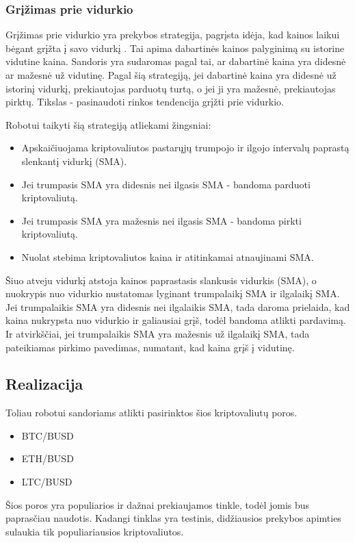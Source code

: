 \documentclass{VUMIFInfKursinis}
\begin{document}
\subsubsection{Grįžimas prie vidurkio}

Grįžimas prie vidurkio yra prekybos strategija, pagrįsta idėja, kad kainos laikui bėgant grįžta į savo vidurkį \cite{voltaprofitable}. 
Tai apima dabartinės kainos palyginimą su istorine vidutine kaina. Sandoris yra sudaromas pagal tai, ar dabartinė kaina yra didesnė ar mažesnė už vidutinę.
Pagal šią strategiją, jei dabartinė kaina yra didesnė už istorinį vidurkį, prekiautojas parduotų turtą, o jei ji yra mažesnė, prekiautojas pirktų. 
Tikslas - pasinaudoti rinkos tendencija grįžti prie vidurkio.

Robotui taikyti šią strategiją atliekami žingsniai:
\begin {itemize}
\item Apskaičiuojama kriptovaliutos pastarųjų trumpojo ir ilgojo intervalų paprastą slenkantį vidurkį (SMA).
\item Jei trumpasis SMA yra didesnis nei ilgasis SMA - bandoma parduoti kriptovaliutą.
\item Jei trumpasis SMA yra mažesnis nei ilgasis SMA - bandoma pirkti kriptovaliutą.
\item Nuolat stebima kriptovaliutos kaina ir atitinkamai atnaujinami SMA.
\end {itemize}

Šiuo atveju vidurkį atstoja kainos paprastasis slankusis vidurkis (SMA), o nuokrypis nuo vidurkio nustatomas lyginant trumpalaikį SMA ir ilgalaikį SMA.
Jei trumpalaikis SMA yra didesnis nei ilgalaikis SMA, tada daroma prielaida, kad kaina nukrypsta nuo vidurkio
ir galiausiai grįš, todėl bandoma atlikti pardavimą. Ir atvirkščiai, jei trumpalaikis SMA yra mažesnis už ilgalaikį SMA, tada pateikiamas pirkimo pavedimas, numatant, 
kad kaina grįš į vidutinę.


\subsection{Realizacija}

Toliau robotui sandoriams atlikti pasirinktos šios kriptovaliutų poros. 
\begin {itemize}
\item BTC/BUSD
\item ETH/BUSD
\item LTC/BUSD
\end {itemize}
Šios poros yra populiarios ir dažnai prekiaujamos tinkle, todėl jomis bus paprasčiau naudotis. Kadangi tinklas yra testinis, didžiausios prekybos apimties sulaukia
tik populiariausios kriptovaliutos.
\end{document}
